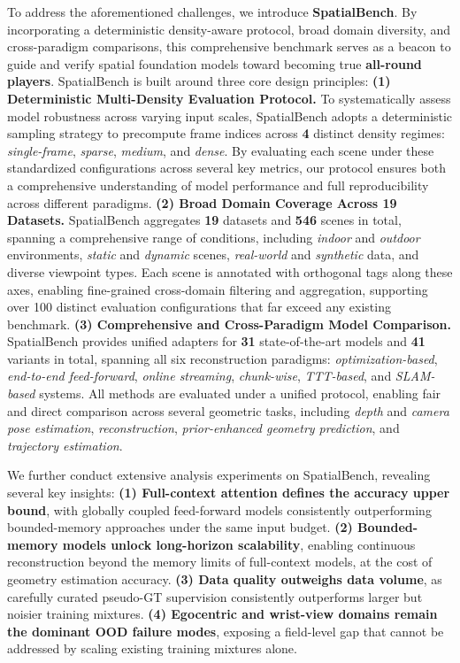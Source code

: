 \documentclass{llmxive}
\providecommand{\benchmark}{SpatialBench\xspace}
\begin{document}
To address the aforementioned challenges, we introduce \textbf{\benchmark}. 
%
By incorporating a deterministic density-aware protocol, broad domain diversity, and cross-paradigm comparisons, this comprehensive benchmark serves as a beacon to guide and verify spatial foundation models toward becoming true \textbf{all-round players}.
%
\benchmark is built around three core design principles:
%
\noindent\textbf{(1) Deterministic Multi-Density Evaluation Protocol.}
To systematically assess model robustness across varying input scales, \benchmark adopts a deterministic sampling strategy to precompute frame indices across \textbf{4} distinct density regimes: \textit{single-frame}, \textit{sparse}, \textit{medium}, and \textit{dense}. 
%
By evaluating each scene under these standardized configurations across several key metrics, our protocol ensures both a comprehensive understanding of model performance and full reproducibility across different paradigms.
%
\noindent\textbf{(2) Broad Domain Coverage Across 19 Datasets.}
%
\benchmark aggregates \textbf{19} datasets and \textbf{546} scenes in total, spanning a comprehensive range of conditions, including \textit{indoor} and \textit{outdoor} environments, \textit{static} and \textit{dynamic} scenes, \textit{real-world} and \textit{synthetic} data, and diverse viewpoint types.
%
Each scene is annotated with orthogonal tags along these axes, enabling fine-grained cross-domain filtering and aggregation, supporting over 100 distinct evaluation configurations that far exceed any existing benchmark.
%
\noindent\textbf{(3) Comprehensive and Cross-Paradigm Model Comparison.}
%
\benchmark provides unified adapters for \textbf{31} state-of-the-art models and \textbf{41} variants in total, spanning all six reconstruction paradigms: \textit{optimization-based}, \textit{end-to-end feed-forward}, \textit{online streaming}, \textit{chunk-wise}, \textit{TTT-based}, and \textit{SLAM-based} systems.
%
All methods are evaluated under a unified protocol, enabling fair and direct comparison across several geometric tasks, including \textit{depth} and \textit{camera pose estimation}, \textit{reconstruction}, \textit{prior-enhanced geometry prediction}, and \textit{trajectory estimation}.

We further conduct extensive analysis experiments on \benchmark, revealing several key insights:
\textbf{(1) Full-context attention defines the accuracy upper bound}, with globally coupled feed-forward models consistently outperforming bounded-memory approaches under the same input budget.
%
\textbf{(2) Bounded-memory models unlock long-horizon scalability}, enabling continuous reconstruction beyond the memory limits of full-context models, at the cost of geometry estimation accuracy.
%
\textbf{(3) Data quality outweighs data volume}, as carefully curated pseudo-GT supervision consistently outperforms larger but noisier training mixtures.
%
\textbf{(4) Egocentric and wrist-view domains remain the dominant OOD failure modes}, exposing a field-level gap that cannot be addressed by scaling existing training mixtures alone.
\end{document}
